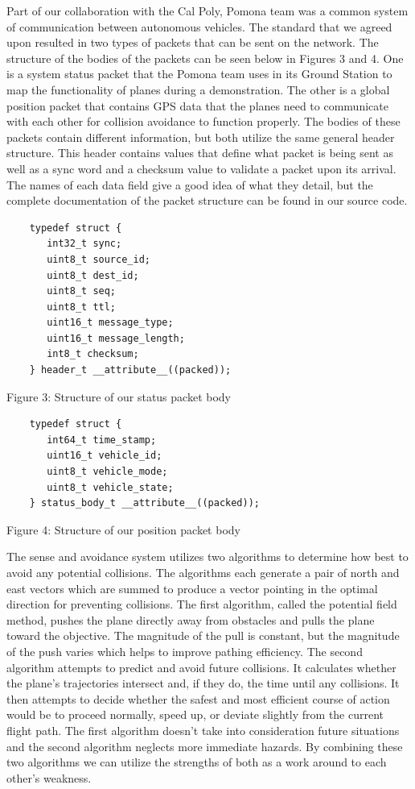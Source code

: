 \documentclass[12pt]{article}
\begin{document}
Part of our collaboration with the Cal Poly, Pomona team was a common system of communication between autonomous vehicles. The standard that we agreed upon resulted in two types of packets that can be sent on the network. The structure of the bodies of the packets can be seen below in Figures 3 and 4. One is a system status packet that the Pomona team uses in its Ground Station to map the functionality of planes during a demonstration. The other is a global position packet that contains GPS data that
the planes need to communicate with each other for collision avoidance to function properly. The bodies of these packets contain different information, but both utilize the same general header structure. This header contains values that define what packet is being sent as well as a sync word and a checksum value to validate a packet upon its arrival. The names of each data field give a good idea of what they detail, but the complete documentation of the packet structure can be found in our source code.

\begin{centering}
\begin{verbatim}
	typedef struct {
	   int32_t sync;
	   uint8_t source_id;
	   uint8_t dest_id;
	   uint8_t seq;
	   uint8_t ttl;
	   uint16_t message_type;
	   uint16_t message_length;
	   int8_t checksum;
	} header_t __attribute__((packed));
\end{verbatim}
Figure 3: Structure of our status packet body

\begin{verbatim}
	typedef struct {
	   int64_t time_stamp;
	   uint16_t vehicle_id;
	   uint8_t vehicle_mode;
	   uint8_t vehicle_state;
	} status_body_t __attribute__((packed));
\end{verbatim}
Figure 4: Structure of our position packet body\par
\end{centering}
\bigskip
The sense and avoidance system utilizes two algorithms to determine how best to avoid any potential collisions. The algorithms each generate a pair of north and east vectors which are summed to produce a vector pointing in the optimal direction for preventing collisions. The first algorithm, called the potential field method, pushes the plane directly away from obstacles and pulls the plane toward the objective. The magnitude of the pull is constant, but the magnitude of the push varies which helps to improve pathing efficiency. The second algorithm attempts to predict and avoid future collisions. It calculates whether the plane's trajectories intersect and, if they do, the time until any collisions. It then attempts to decide whether the safest and most efficient course of action would be to proceed normally, speed up, or deviate slightly from the current flight path. The first algorithm doesn't take into consideration future situations and the second algorithm neglects more immediate hazards. By combining these two algorithms we can utilize the strengths of both as a work around to each other's weakness. 
\end{document}
